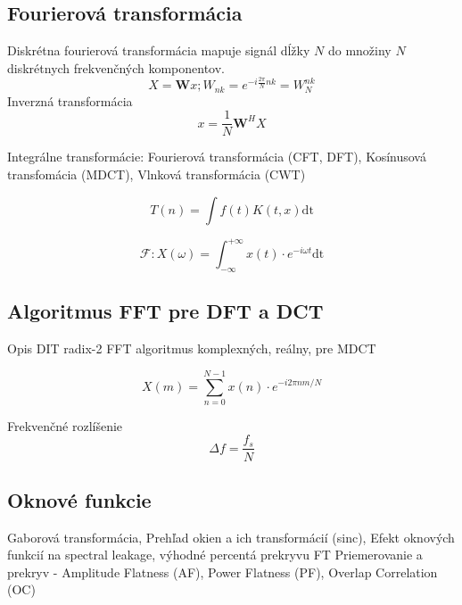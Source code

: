 \subsection{Fourierová transformácia}
Diskrétna fourierová transformácia mapuje signál dĺžky $N$ do množiny $N$ diskrétnych frekvenčných komponentov. \cite{signal-processing}
\begin{equation}
X = \mathbf{W}x; W_{nk} = e^{-i\frac{2\pi}{N}nk} = W_N^{nk}
\end{equation}
Inverzná transformácia
\begin{equation}
x = \frac{1}{N}\mathbf{W}^H X
\end{equation}

Integrálne transformácie: Fourierová transformácia (CFT, DFT), Kosínusová transfomácia (MDCT), Vlnková transformácia (CWT) \cite{dct} \cite{casove-frekvencia-analyza-signalu}

\begin{equation}
T(n) = \int{f(t) K(t,x) \mathrm{dt}}
\end{equation}

\begin{equation}
\mathcal{F}: X(\omega) = \int_{-\infty}^{+\infty}{x(t) \cdot e^{-i\omega t} \mathrm{dt}}
\end{equation}

\subsection{Algoritmus FFT pre DFT a DCT}
Opis DIT radix-2 FFT algoritmus komplexných, reálny, pre MDCT \cite{fft-blackbox}

\begin{equation}
X(m) = \sum_{n = 0}^{N-1}{x(n) \cdot e^{-i2\pi n m / N}}
\end{equation}

Frekvenčné rozlíšenie
\begin{equation}
\Delta f = \frac{f_s}{N}
\end{equation}

\subsection{Oknové funkcie}
Gaborová transformácia, Prehľad okien a ich transformácií (sinc), Efekt oknových funkcií na spectral leakage, výhodné percentá prekryvu FT 	\cite{understanding-dsp} \cite{spectral-density-estimation}
Priemerovanie a prekryv - Amplitude Flatness (AF), Power Flatness (PF), Overlap Correlation (OC)

